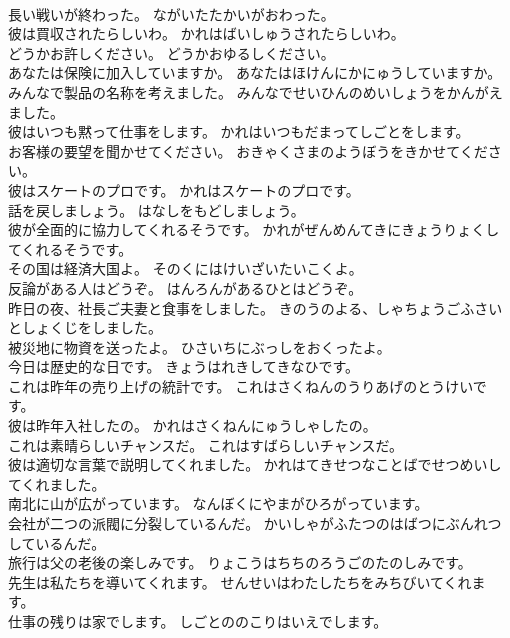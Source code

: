 \documentclass[8pt]{extreport}
\begin{document}
\begin{CJK}{UTF8}{min}
\\	長い戦いが終わった。	ながいたたかいがおわった。 
\\	彼は買収されたらしいわ。	かれはばいしゅうされたらしいわ。 
\\	どうかお許しください。	どうかおゆるしください。 
\\	あなたは保険に加入していますか。	あなたはほけんにかにゅうしていますか。 
\\	みんなで製品の名称を考えました。	みんなでせいひんのめいしょうをかんがえました。 
\\	彼はいつも黙って仕事をします。	かれはいつもだまってしごとをします。 
\\	お客様の要望を聞かせてください。	おきゃくさまのようぼうをきかせてください。 
\\	彼はスケートのプロです。	かれはスケートのプロです。 
\\	話を戻しましょう。	はなしをもどしましょう。 
\\	彼が全面的に協力してくれるそうです。	かれがぜんめんてきにきょうりょくしてくれるそうです。 
\\	その国は経済大国よ。	そのくにはけいざいたいこくよ。 
\\	反論がある人はどうぞ。	はんろんがあるひとはどうぞ。 
\\	昨日の夜、社長ご夫妻と食事をしました。	きのうのよる、しゃちょうごふさいとしょくじをしました。 
\\	被災地に物資を送ったよ。	ひさいちにぶっしをおくったよ。 
\\	今日は歴史的な日です。	きょうはれきしてきなひです。 
\\	これは昨年の売り上げの統計です。	これはさくねんのうりあげのとうけいです。 
\\	彼は昨年入社したの。	かれはさくねんにゅうしゃしたの。 
\\	これは素晴らしいチャンスだ。	これはすばらしいチャンスだ。 
\\	彼は適切な言葉で説明してくれました。	かれはてきせつなことばでせつめいしてくれました。 
\\	南北に山が広がっています。	なんぼくにやまがひろがっています。 
\\	会社が二つの派閥に分裂しているんだ。	かいしゃがふたつのはばつにぶんれつしているんだ。 
\\	旅行は父の老後の楽しみです。	りょこうはちちのろうごのたのしみです。 
\\	先生は私たちを導いてくれます。	せんせいはわたしたちをみちびいてくれます。 
\\	仕事の残りは家でします。	しごとののこりはいえでします。 

\end{CJK}
\end{document}
